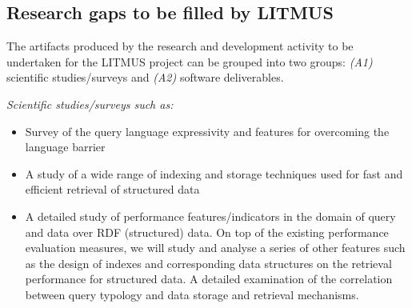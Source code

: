 \documentclass{llncs}
\begin{document}
    \subsection{Research gaps to be filled by LITMUS}
    The artifacts produced by the research and development activity to be undertaken for the LITMUS project can be grouped into two groups: \textit{(A1)} scientific studies/surveys and \textit{(A2)} software deliverables. 
    
    \textit{ Scientific studies/surveys such as:} 
        \begin{itemize}
            \item Survey of the query language expressivity and features for overcoming the language barrier
            \item A study of a wide range of indexing and storage techniques used for fast and efficient retrieval of structured data
            \item A detailed study of performance features/indicators in the domain of query and data over RDF (structured) data. On top of the existing performance evaluation measures, we will study and analyse a series of other features such as the design of indexes and corresponding data structures on the retrieval performance for structured data. A detailed examination of the correlation between query typology and data storage and retrieval mechanisms.
        \end{itemize}
        
\end{document}
